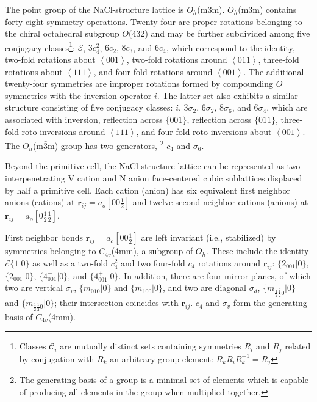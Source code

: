 \documentclass[twocolumn,showpacs,preprintnumbers,superscriptaddress,prb,floatfix,aps,10pt]{revtex4-1}
\renewcommand{\vec}[1]{\ensuremath{\mathbf{#1}}}
\newcommand*{\class}{\mathcal{C}}
\newcommand*{\id}{\mathcal{E}}
\newcommand*{\bondvec}{\vec{r}_{ij}}
\newcommand{\seitz}[2]{\{#1|#2\}}
\begin{document}
The point group of the NaCl-structure lattice is $O_h$(m$\bar{3}$m). $O_h$(m$\bar{3}$m) contains forty-eight symmetry operations. Twenty-four are proper rotations belonging to the chiral octahedral subgroup $O$(432) and may be further subdivided among five conjugacy classes\footnote{Classes $\class_i$ are mutually distinct sets containing symmetries $R_i$ and $R_j$ related by conjugation with $R_k$ an arbitrary group element: $R_kR_iR_k^{-1}=R_j$}: $\id$, $3c_4^2$, $6c_2$, $8c_3$, and $6c_4$, which correspond to the identity, two-fold rotations about $\left<001\right>$, two-fold rotations around $\left<011\right>$, three-fold rotations about $\left<111\right>$, and four-fold rotations around $\left<001\right>$. The additional twenty-four symmetries are improper rotations formed by compounding $O$ symmetries with the inversion operator $i$. The latter set also exhibits a similar structure consisting of five conjugacy classes: $i$, $3\sigma_2$, $6\sigma_2$, $8\sigma_6$, and $6\sigma_4$, which are associated with inversion, reflection across $\{001\}$, reflection across $\{011\}$, three-fold roto-inversions around $\left<111\right>$, and four-fold roto-inversions about $\left<001\right>$. The $O_h$(m$\bar{3}$m) group has two generators, \footnote{The generating basis of a group is a minimal set of elements which is capable of producing all elements in the group when multiplied together.} $c_4$ and $\sigma_6$.


Beyond the primitive cell, the NaCl-structure lattice can be represented as two interpenetrating V cation and N anion face-centered cubic sublattices displaced by half a primitive cell. Each cation (anion) has six equivalent first neighbor anions (cations) at $\bondvec = a_o [0 0 \frac{1}{2}]$ and twelve second neighbor cations (anions) at $\bondvec = a_o[0 \frac{1}{2} \frac{1}{2}]$. 

First neighbor bonds $\bondvec = a_o[00\frac{1}{2}]$ are left invariant (i.e., stabilized) by symmetries belonging to $C_{4v}$(4mm), a subgroup of $O_h$. These include the identity $\id \seitz{1}{0}$ as well as a two-fold $c_{4}^2$ and two four-fold $c_{4}$ rotations around $\bondvec$: $\seitz{2_{001}}{0}$, $\seitz{2_{001}}{0}$, $\seitz{4^-_{001}}{0}$, and $\seitz{4^+_{001}}{0}$. In addition, there are four mirror planes, of which two are vertical $\sigma_v$, $\seitz{m_{010}}{0}$ and $\seitz{m_{100}}{0}$, and two are diagonal $\sigma_d$, $\seitz{m_{\frac{1}{2}\bar{\frac{1}{2}}0}}{0}$ and $\seitz{m_{\frac{1}{2}\frac{1}{2}0}}{0}$; their intersection coincides with $\bondvec$. $c_4$ and $\sigma_v$ form the generating basis of $C_{4v}$(4mm). 
\end{document}
